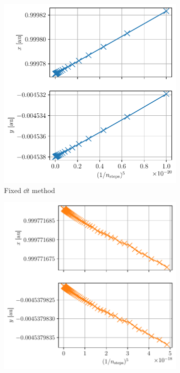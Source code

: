 \begin{figure}[h]
    \centering
    \begin{subfigure}{0.45\linewidth}
        \centering
        \includegraphics[width=\linewidth]{figures/lagrange_convergence_fixed.pdf}
        \caption{Fixed \(\dd t\) method}
        \label{fig:lagrange_conv_fixed}
    \end{subfigure}
    \begin{subfigure}{0.49\linewidth}
        \centering
        \includegraphics[width=\linewidth]{figures/lagrange_convergence_adapt.pdf}

\end{subfigure}
\end{figure}

